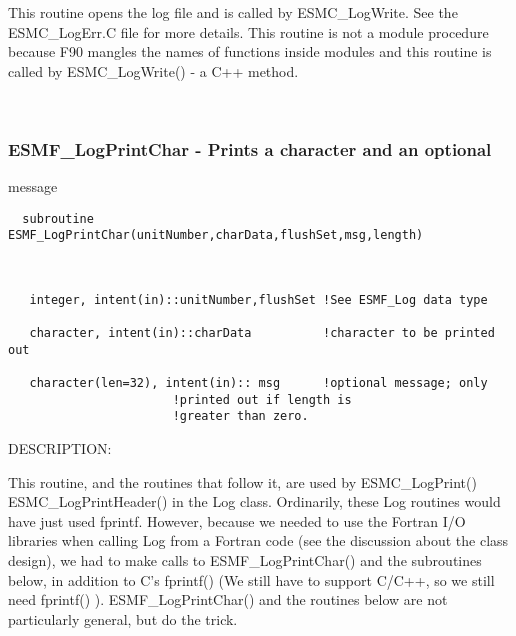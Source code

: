    This routine opens the log file and is called by ESMC\_LogWrite.
   See the ESMC\_LogErr.C file for more details.
   This routine is not a module procedure because F90 mangles
   the names of functions
   inside modules and this routine is called by ESMC\_LogWrite() - a C++
   method.
   
 
\mbox{}\hrulefill\ 
 
\subsubsection [ESMF\_LogPrintChar] {ESMF\_LogPrintChar - Prints a character and an optional }


                                   message
  
\begin{verbatim}  subroutine ESMF_LogPrintChar(unitNumber,charData,flushSet,msg,length)\end{verbatim}
 
 
\mbox{}\hrulefill\ 
 

\begin{verbatim}   integer, intent(in)::unitNumber,flushSet !See ESMF_Log data type
 
   character, intent(in)::charData          !character to be printed out
 
   character(len=32), intent(in):: msg      !optional message; only
 					   !printed out if length is
 					   !greater than zero.\end{verbatim}
{\sf DESCRIPTION:\\ }


   This routine, and the routines that follow it, are used by ESMC\_LogPrint()
   ESMC\_LogPrintHeader() in the Log class.  Ordinarily, these Log routines would
   have just used fprintf.  However, because we needed to use the Fortran I/O 
   libraries when calling Log from a Fortran code
   (see the discussion about the class design), we had to make 
   calls to ESMF\_LogPrintChar() and the subroutines below, in addition to
   C's fprintf() (We still have to support C/C++, so we still need fprintf() ).
   ESMF\_LogPrintChar() and the routines below are not particularly general,
   but do the trick. 
 
